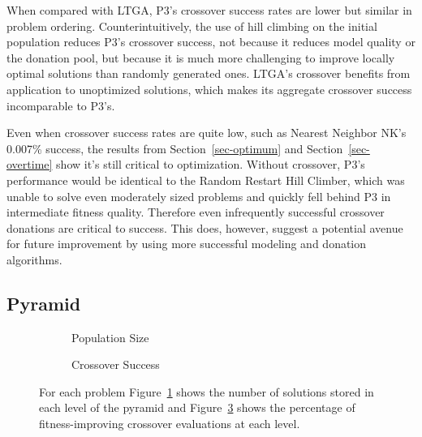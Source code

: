When compared with LTGA, P3's crossover success rates are lower but similar in problem ordering.
Counterintuitively, the use of hill climbing on the initial population reduces
P3's crossover success, not because it reduces model quality or the donation pool, but because it is much more challenging to improve
locally optimal solutions than randomly generated ones. LTGA's crossover benefits from application to unoptimized solutions, which
makes its aggregate crossover success incomparable to P3's.

Even when crossover success rates are quite low, such as Nearest Neighbor NK's 0.007\% success,
the results from Section~\ref{sec-optimum} and Section~\ref{sec-overtime} show it's still critical to optimization. Without
crossover, P3's performance would be identical to the Random Restart Hill Climber, which was unable to solve even moderately sized problems
and quickly fell behind P3 in intermediate fitness quality. Therefore even infrequently successful crossover donations are
critical to success. This does, however, suggest a potential avenue for future improvement by using more successful
modeling and donation algorithms.

\subsection{Pyramid}
\begin{figure}[t]
  \begin{centering}
    \begin{subfigure}{.5\textwidth}
      \begin{centering}
      \end{centering}
      \caption{Population Size}
      \label{fig-level-size}
    \end{subfigure}%
    \begin{subfigure}{.5\textwidth}
      \begin{centering}
      \end{centering}
      \caption{Crossover Success}
      \label{fig-level-success}
    \end{subfigure}
  \end{centering}
  \caption{For each problem Figure~\ref{fig-level-size} shows the number of solutions stored in each level of the pyramid
           and Figure~\ref{fig-level-success} shows the percentage of fitness-improving crossover evaluations at each level.}
\end{figure}

